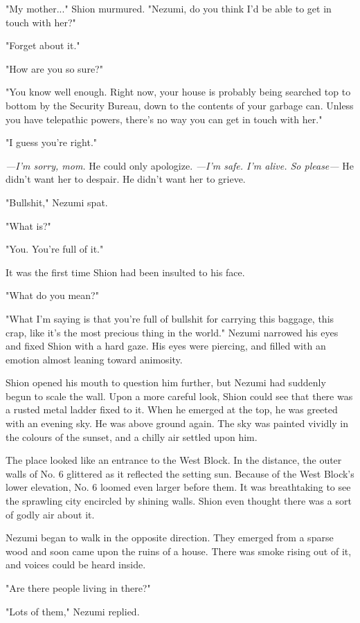 "My mother..." Shion murmured. "Nezumi, do you think I'd be able to get
in touch with her?"

"Forget about it."

"How are you so sure?"

"You know well enough. Right now, your house is probably being searched
top to bottom by the Security Bureau, down to the contents of your
garbage can. Unless you have telepathic powers, there's no way you can
get in touch with her."

"I guess you're right."

\emph{---I'm sorry, mom.} He could only apologize. \emph{---I'm safe. I'm alive. So
please---} He didn't want her to despair. He didn't want her to grieve.

"Bullshit," Nezumi spat.

"What is?"

"You. You're full of it."

It was the first time Shion had been insulted to his face.

"What do you mean?"

"What I'm saying is that you're full of bullshit for carrying this
baggage, this crap, like it's the most precious thing in the world."
Nezumi narrowed his eyes and fixed Shion with a hard gaze. His eyes were
piercing, and filled with an emotion almost leaning toward animosity.

Shion opened his mouth to question him further, but Nezumi had suddenly
begun to scale the wall. Upon a more careful look, Shion could see that
there was a rusted metal ladder fixed to it. When he emerged at the top,
he was greeted with an evening sky. He was above ground again. The sky
was painted vividly in the colours of the sunset, and a chilly air
settled upon him.

The place looked like an entrance to the West Block. In the distance,
the outer walls of No. 6 glittered as it reflected the setting sun.
Because of the West Block's lower elevation, No. 6 loomed even larger
before them. It was breathtaking to see the sprawling city encircled by
shining walls. Shion even thought there was a sort of godly air about
it.

Nezumi began to walk in the opposite direction. They emerged from a
sparse wood and soon came upon the ruins of a house. There was smoke
rising out of it, and voices could be heard inside.

"Are there people living in there?"

"Lots of them," Nezumi replied.

